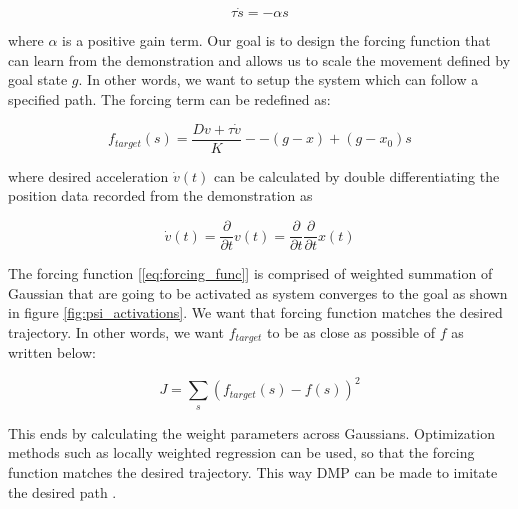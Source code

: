 \documentclass[sigconf]{acmart}
\begin{document}
\begin{equation}
	\tau \dot{s} = - \alpha s
\end{equation}

where $\alpha$ is a positive gain term. Our goal is to design the forcing function that can learn from the demonstration and allows us to scale the movement defined by goal state $g$. In other words, we want to setup the system which can follow a specified path. The forcing term can be redefined as:

\begin{equation}
	f_{target}(s) = \frac{D v + \tau \dot{v}}{K} - - (g - x) +  (g - x_0) s
\end{equation}

where desired acceleration $\dot{v}(t)$ can be calculated by double differentiating the position data recorded from the demonstration as

\begin{equation}
	\dot{v}(t) = \frac{\partial}{\partial t} v(t) = \frac{\partial}{\partial t} \frac{\partial}{\partial t} x(t)
\end{equation}

The forcing function [\ref{eq:forcing_func}] is comprised of weighted summation of Gaussian that are going to be activated as system converges to the goal as shown in figure \ref{fig:psi_activations}. We want that forcing function matches the desired trajectory. In other words, we want $f_{target}$ to be as close as possible of $f$ as written below:

\begin{equation}
	J = \sum_{s} \left( f_{target}(s) - f(s) \right)^2
\end{equation}

This ends by calculating the weight parameters across Gaussians. Optimization methods such as locally weighted regression \cite{vijayakumar2000locally} can be used, so that the forcing function matches the desired trajectory. This way DMP can be made to imitate the desired path \cite{pastor2009learning}.
\end{document}
